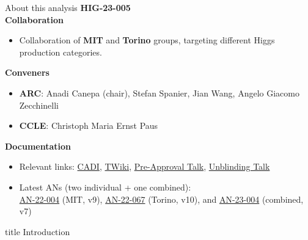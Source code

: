 \documentclass[9pt,aspectratio=1610]{beamer}
\newcommand{\kbhl}[1]{\textbf{\LARGE\color{BlueViolet}#1}}
\begin{document}
\begin{frame}{About this analysis}
	\label{fr:about}
	\kbhl{HIG-23-005}\\
	\vspace{1em}
	\textbf{Collaboration}
	\begin{itemize}
		\item Collaboration of \textbf{MIT} and \textbf{Torino} groups, targeting different Higgs production categories.
	\end{itemize}

	\textbf{Conveners}
	\begin{itemize}
		\item \textbf{ARC}: Anadi Canepa (chair), Stefan Spanier, Jian Wang, Angelo Giacomo Zecchinelli
		\item \textbf{CCLE}: Christoph Maria Ernst Paus
	\end{itemize}

	\textbf{Documentation}
	\begin{itemize}
		\item Relevant links: \href{https://cms.cern.ch/iCMS/analysisadmin/cadilines?id=2681&ancode=HIG-23-005&tp=an&line=HIG-23-005}{CADI}, \href{https://twiki.cern.ch/twiki/bin/view/CMS/HMesonGamma_QA}{TWiki}, \href{https://indico.cern.ch/event/1298068/\#29-pre-approval-of-hig-23-005}{Pre-Approval Talk}, \href{https://indico.cern.ch/event/1319601/\#21-unblinding-of-hig-23-005-se}{Unblinding Talk}
		\item Latest ANs (two individual + one combined):\\ \href{http://cms.cern.ch/iCMS/jsp/openfile.jsp?tp=draft&files=AN2022_004_v9.pdf}{AN-22-004} (MIT, v9), \href{http://cms.cern.ch/iCMS/jsp/openfile.jsp?tp=draft&files=AN2022_067_v10.pdf}{AN-22-067} (Torino, v10), and \href{http://cms.cern.ch/iCMS/jsp/openfile.jsp?tp=draft&files=AN2023_004_v7.pdf}{AN-23-004} (combined, v7)
	\end{itemize}
\end{frame}

\begin{frame}
	\label{sec:intro}
	\vfill
	\centering
	\begin{beamercolorbox}[sep=8pt,center,shadow=false,rounded=true]{title}
		\Huge Introduction \par%
	\end{beamercolorbox}
	\vfill
\end{frame}
\end{document}
